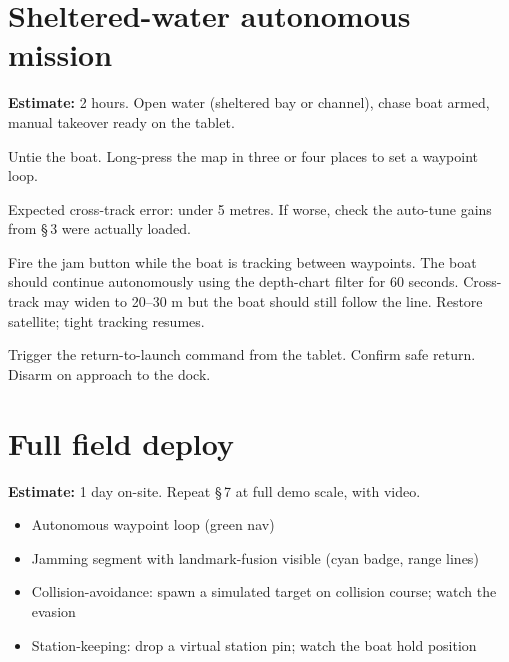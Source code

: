 \documentclass[10pt,a4paper]{article}
\begin{document}
\section{Sheltered-water autonomous mission}
\textbf{Estimate:} 2 hours. Open water (sheltered bay or channel),
chase boat armed, manual takeover ready on the tablet.

\begin{stepbox}
Untie the boat. Long-press the map in three or four places to set a
waypoint loop.
\end{stepbox}

\begin{stepbox}
Expected cross-track error: under 5 metres. If worse, check the
auto-tune gains from §\,3 were actually loaded.
\end{stepbox}

\begin{stepbox}
Fire the jam button while the boat is tracking between waypoints.
The boat should continue autonomously using the depth-chart filter
for 60 seconds. Cross-track may widen to 20--30 m but the boat
should still follow the line. Restore satellite; tight tracking
resumes.
\end{stepbox}

\begin{stepbox}
Trigger the return-to-launch command from the tablet. Confirm safe
return. Disarm on approach to the dock.
\end{stepbox}

\section{Full field deploy}
\textbf{Estimate:} 1 day on-site. Repeat §\,7 at full demo scale, with
video.

\begin{stepbox}
\begin{itemize}
\item Autonomous waypoint loop (green nav)
\item Jamming segment with landmark-fusion visible (cyan badge, range lines)
\item Collision-avoidance: spawn a simulated target on collision course; watch the evasion
\item Station-keeping: drop a virtual station pin; watch the boat hold position
\end{itemize}
\end{stepbox}
\end{document}
